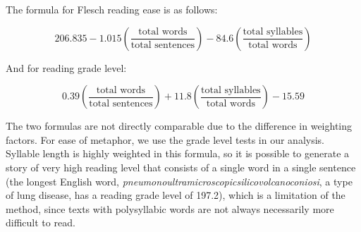 The formula for Flesch reading ease is as follows:

$$206.835 - 1.015 \left( \frac{\mbox{total words}}{\mbox{total sentences}} \right) - 84.6 \left( \frac{\mbox{total syllables}}{\mbox{total words}} \right)$$

And for reading grade level:

$$0.39 \left ( \frac{\mbox{total words}}{\mbox{total sentences}} \right ) + 11.8 \left ( \frac{\mbox{total syllables}}{\mbox{total words}} \right ) - 15.59$$
 
The two formulas are not directly comparable due to the difference in weighting factors. For ease of metaphor, we use the grade level tests in our analysis. Syllable length is highly weighted in this formula, so it is possible to generate a story of very high reading level that consists of a single word in a single sentence (the longest English word, \emph{pneumonoultramicroscopicsilicovolcanoconiosi}, a type of lung disease, has a reading grade level of 197.2), which is a limitation of the method, since texts with polysyllabic words are not always necessarily more difficult to read.
  